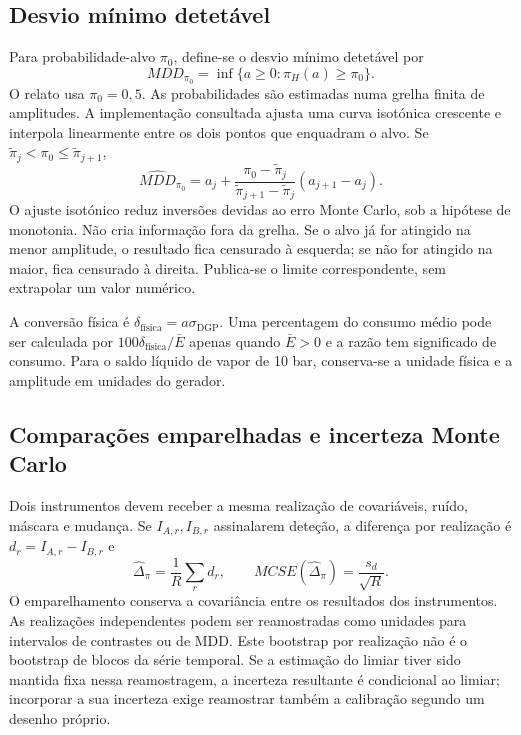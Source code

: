 \subsection{Desvio mínimo detetável}
\label{sec:mat-mdd}
Para probabilidade-alvo $\pi_0$, define-se o desvio mínimo detetável por
\begin{equation}
MDD_{\pi_0}=\inf\{a\geq0:\pi_H(a)\geq\pi_0\}.
\label{eq:mat-mdd}
\end{equation}
O relato usa $\pi_0=0{,}5$. As probabilidades são estimadas numa grelha finita de amplitudes. A implementação consultada ajusta uma curva isotónica crescente e interpola linearmente entre os dois pontos que enquadram o alvo. Se $\widetilde\pi_j<\pi_0\leq\widetilde\pi_{j+1}$,
\begin{equation}
\widehat{MDD}_{\pi_0}=a_j+
\frac{\pi_0-\widetilde\pi_j}{\widetilde\pi_{j+1}-\widetilde\pi_j}(a_{j+1}-a_j).
\label{eq:mat-mdd-interpolacao}
\end{equation}
O ajuste isotónico reduz inversões devidas ao erro Monte Carlo, sob a hipótese de monotonia. Não cria informação fora da grelha. Se o alvo já for atingido na menor amplitude, o resultado fica censurado à esquerda; se não for atingido na maior, fica censurado à direita. Publica-se o limite correspondente, sem extrapolar um valor numérico.

A conversão física é $\delta_{\mathrm{física}}=a\sigma_{\mathrm{DGP}}$. Uma percentagem do consumo médio pode ser calculada por $100\delta_{\mathrm{física}}/\bar E$ apenas quando $\bar E>0$ e a razão tem significado de consumo. Para o saldo líquido de vapor de 10 bar, conserva-se a unidade física e a amplitude em unidades do gerador.

\subsection{Comparações emparelhadas e incerteza Monte Carlo}
\label{sec:mat-mc-emparelhado}
Dois instrumentos devem receber a mesma realização de covariáveis, ruído,
máscara e mudança. Se $I_{A,r},I_{B,r}$ assinalarem deteção, a diferença por realização é $d_r=I_{A,r}-I_{B,r}$ e
\begin{equation}
\widehat\Delta_\pi=\frac1R\sum_rd_r,
\qquad MCSE(\widehat\Delta_\pi)=\frac{s_d}{\sqrt R}.
\label{eq:mat-mc-emparelhado}
\end{equation}
O emparelhamento conserva a covariância entre os resultados dos instrumentos. As realizações independentes podem ser reamostradas como unidades para intervalos de contrastes ou de MDD. Este bootstrap por realização não é o bootstrap de blocos da série temporal. Se a estimação do limiar tiver sido mantida fixa nessa reamostragem, a incerteza resultante é condicional ao limiar; incorporar a sua incerteza exige reamostrar também a calibração segundo um desenho próprio.

